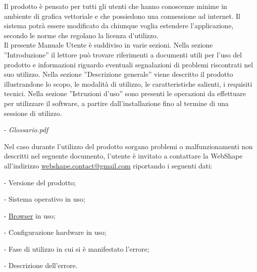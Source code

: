  
\newpage
\thispagestyle{fancy}
\tableofcontents
\thispagestyle{fancy}
\newpage
 
 
Il prodotto \`e pensato per tutti gli utenti che hanno conoscenze minime in ambiente di grafica vettoriale e che possiedono una connessione ad internet. Il sistema potr\`a essere modificato da chiunque voglia estendere l'applicazione, secondo le norme che regolano la licenza d'utilizzo.\\
 
Il presente Manuale Utente \`e suddiviso in varie sezioni. Nella sezione ''Introduzione'' il lettore pu\`o trovare riferimenti a documenti utili per l'uso del prodotto e informazioni riguardo eventuali segnalazioni di problemi riscontrati nel suo utilizzo.
Nella sezione ''Descrizione generale'' viene descritto il prodotto illustrandone lo scopo, le modalit\`a di utilizzo, le caratteristiche salienti, i requisiti tecnici. Nella sezione ''Istruzioni d'uso'' sono presenti le operazioni da effettuare per utilizzare il software, a partire dall'installazione fino al termine di una sessione di utilizzo.\\ %
 
 
\begin{elencopuntato}[\normindent]
  \item[-] \textit{Glossario.pdf}
\end{elencopuntato}
 
Nel caso durante l'utilizzo del prodotto sorgano problemi o malfunzionamenti non descritti nel seguente documento, l'utente \`e invitato a contattare la WebShape all'indirizzo \href{mailto:webshape.contact@gmail.com}{webshape.contact@gmail.com} riportando i seguenti dati:\\
\begin{elencopuntato}[\normindent]
  \item[-] Versione del prodotto;
  \item[-] Sistema operativo in uso;
  \item[-] \underline{Browser} in uso;
  \item[-] Configurazione hardware in uso;
  \item[-] Fase di utilizzo in cui si \`e manifestato l'errore;
  \item[-] Descrizione dell'errore.
\end{elencopuntato}
 

